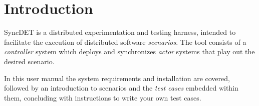 \section{Introduction}

SyncDET is a distributed experimentation and testing harness, intended to
facilitate the execution of distributed software {\em scenarios}. The tool
consists of a {\em controller} system which deploys and synchronizes {\em actor}
systems that play out the desired scenario.

In this user manual the system requirements and installation are covered,
followed by an introduction to scenarios and the {\em test cases} embedded
within them, concluding with instructions to write your own test cases.

